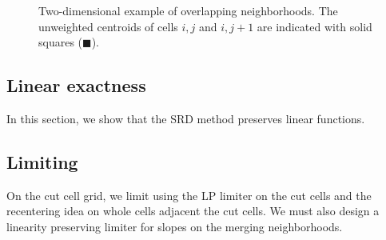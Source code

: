 \begin{figure}
	\hfill
	\caption{\sf Two-dimensional example of overlapping neighborhoods.  The unweighted centroids of cells $i,j$ and $i,j+1$ are indicated with solid squares ($\blacksquare$).} \label{fig:2nborTile}
\end{figure}

\subsection{Linear exactness}
In this section, we show that the SRD method preserves linear functions.

\subsection{Limiting}
On the cut cell grid, we limit using the LP limiter on the cut cells and the recentering idea on whole cells adjacent the cut cells.  We must also design a linearity preserving limiter for slopes on the merging neighborhoods.

